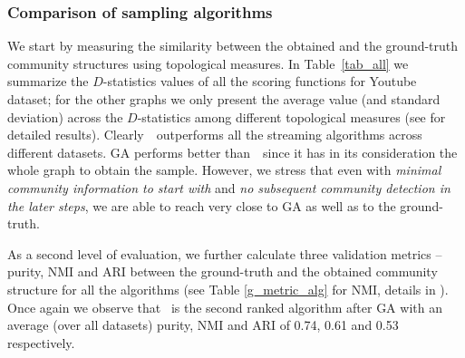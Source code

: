 \begin{table}[!t]
\centering
\caption{\label{g_metric_alg}NMI between the ground-truth and community structure obtained from individual sampling algorithms for all datasets.}
\end{table}

\subsubsection{Comparison of sampling algorithms}

We start by measuring the similarity between the obtained and the ground-truth community structures using topological measures. In Table~\ref{tab_all} we summarize the $D$-statistics values of all the scoring functions for Youtube dataset; for the other graphs we only present the average value (and standard deviation) across the $D$-statistics among different topological measures (see \cite{si} for detailed results). Clearly~\compas~outperforms all the streaming algorithms across different datasets. GA performs better than~\compas~since it has in its consideration the whole graph to obtain the sample. However, we stress that even with {\em minimal community information to start with} and {\em no subsequent community detection in the later steps}, we are able to reach very close to GA as well as to the ground-truth.

As a second level of evaluation, we further calculate three validation metrics -- purity, NMI and ARI  between the ground-truth and the obtained community structure for all the algorithms (see Table \ref{g_metric_alg}  for NMI, details in \cite{si}). Once again we observe that \compas~is the second ranked algorithm after GA with an average (over all datasets) purity, NMI and ARI of 0.74, 0.61 and 0.53 respectively.

